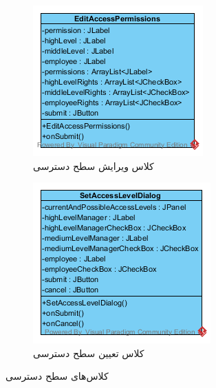 \begin{figure}[H]
	\centering
	\begin{subfigure}[b]{0.3\textwidth}
		\includegraphics[width=\textwidth]{img/class-design/ui/EditAccessPermissions.png}
		\caption{کلاس ویرایش سطح دسترسی}
	\end{subfigure}
	\begin{subfigure}[b]{0.3\textwidth}
		\includegraphics[width=\textwidth]{img/class-design/ui/SetAccessLevelDialog.png}
		\caption{کلاس تعیین سطح دسترسی}
	\end{subfigure}
	\caption{کلاس‌های سطح دسترسی}
\end{figure}

